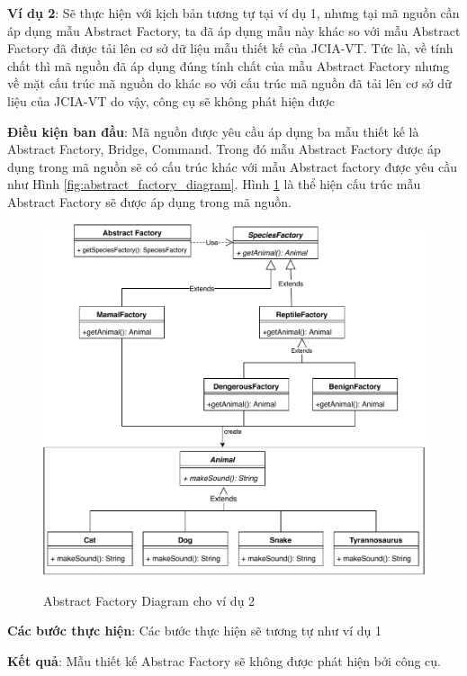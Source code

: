 \documentclass[12pt]{report}
\begin{document}
\newpage
\noindent \textbf{Ví dụ 2}: Sẽ thực hiện với kịch bản tương tự tại ví dụ 1, nhưng tại mã nguồn cần áp dụng mẫu Abstract Factory, ta đã áp dụng mẫu này khác so với mẫu Abstract Factory đã được tải lên cơ sở dữ liệu mẫu thiết kế của JCIA-VT. Tức là, về tính chất thì mã nguồn đã áp dụng đúng tính chất của mẫu Abstract Factory nhưng về mặt cấu trúc mã nguồn do khác so với cấu trúc mã nguồn đã tải lên cơ sở dữ liệu của JCIA-VT do vậy, công cụ sẽ không phát hiện được

\noindent \textbf{Điều kiện ban đầu}: Mã nguồn được yêu cầu áp dụng ba mẫu thiết kế là Abstract Factory, Bridge, Command. Trong đó mẫu Abstract Factory được áp dụng trong mã nguồn sẽ có cấu trúc khác với mẫu Abstract factory được yêu cầu như Hình \ref{fig:abstract_factory_diagram}. Hình \ref{fig:abstract_factory_diaram_2} là thể hiện cấu trúc mẫu Abstract Factory sẽ được áp dụng trong mã nguồn.
\begin{figure}[h]
	\centering
	\includegraphics[scale=0.24]{images/_abstract_factory_2}
	\label{fig:abstract_factory_diaram_2}
	\caption{Abstract Factory Diagram cho ví dụ 2}
\end{figure}

\noindent \textbf{Các bước thực hiện}: Các bước thực hiện sẽ tương tự như ví dụ 1 

\noindent \textbf{Kết quả}: Mẫu thiết kế Abstrac Factory sẽ không được phát hiện bởi công cụ.
\end{document}
